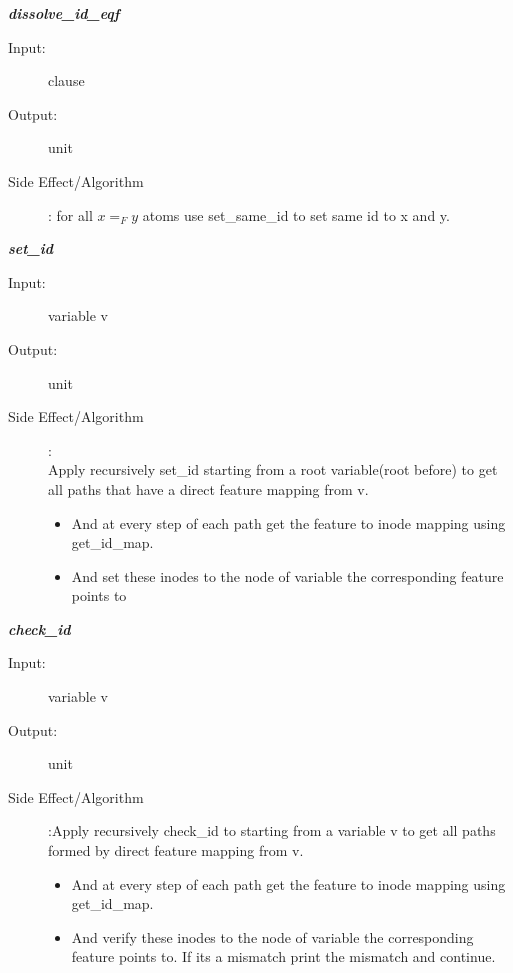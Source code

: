 \documentclass[12pt]{article}
\begin{document}
\begin{description}
\item \textbf{\textit{dissolve\_id\_eqf}}
\begin{description}
    \item[Input:] clause
    \item[Output:] unit
    \item[Side Effect/Algorithm]: for all $x=_F y$ atoms use set\_same\_id to set same id to x and y.
\end{description}

\item \textbf{\textit{set\_id}}
\begin{description}
    \item[Input:] variable v
    \item[Output:] unit
    \item[Side Effect/Algorithm]:\\Apply recursively set\_id starting from a root variable(root before) to get all paths that have a direct feature mapping from v.
    \begin{itemize}
        \item And at every step of each path get the feature to inode mapping using get\_id\_map.
        \item And set these inodes to the node of variable the corresponding feature points to
    \end{itemize}

\end{description}

\item \textbf{\textit{check\_id}}
\begin{description}
    \item[Input:] variable v
    \item[Output:] unit
    \item[Side Effect/Algorithm]:Apply recursively check\_id to starting from a variable v to get all paths formed by direct feature mapping from v.
     \begin{itemize}
        \item And at every step of each path get the feature to inode mapping using get\_id\_map.
        \item And verify these inodes to the node of variable the corresponding feature points to. If its a mismatch print the mismatch and continue.
    \end{itemize}
\end{description}
    
\end{description}
\end{document}
